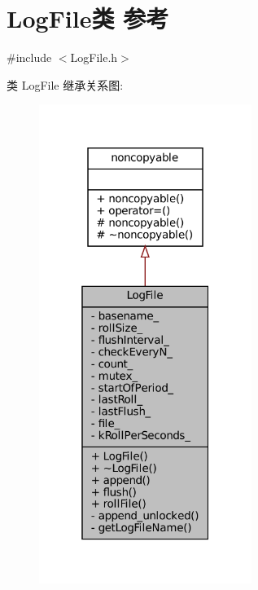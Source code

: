 \hypertarget{classmuduo_1_1LogFile}{}\section{Log\+File类 参考}
\label{classmuduo_1_1LogFile}


{\ttfamily \#include $<$Log\+File.\+h$>$}



类 Log\+File 继承关系图\+:
\nopagebreak
\begin{figure}[H]
\begin{center}
\leavevmode
\includegraphics[width=196pt]{classmuduo_1_1LogFile__inherit__graph}
\end{center}
\end{figure}


